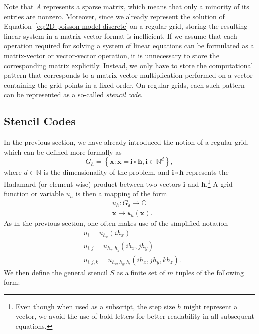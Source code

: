 Note that $A$ represents a sparse matrix, which means that only a minority of its entries are nonzero.
Moreover, since we already represent the solution of Equation~\eqref{eq:2D-poisson-model-discrete} on a regular grid, storing the resulting linear system in a matrix-vector format is inefficient.
If we assume that each operation required for solving a system of linear equations can be formulated as a matrix-vector or vector-vector operation, it is unnecessary to store the corresponding matrix explicitly.
Instead, we only have to store the computational pattern that corresponds to a matrix-vector multiplication performed on a vector containing the grid points in a fixed order.
On regular grids, each such pattern can be represented as a so-called \emph{stencil code}.

\subsection{Stencil Codes}
\label{subsec:stencil-codes}
In the previous section, we have already introduced the notion of a regular grid, which can be defined more formally as
\begin{equation}
	G_{h} = \left\{ \bm{x} : \bm{x} = \bm{i} \circ \bm{h}, \bm{i} \in \mathbb{N}^d \right\},
\end{equation}
where $d \in \mathbb{N}$ is the dimensionality of the problem, and $\bm{i} \circ \bm{h}$ represents the Hadamard (or element-wise) product between two vectors $\bm{i}$ and $\bm{h}$.\footnote{Even though when used as a subscript, the step size $h$ might represent a vector, we avoid the use of bold letters for better readability in all subsequent equations.}
A grid function or variable $u_h$ is then a mapping of the form
\begin{equation}
	\begin{split}
		& u_h : G_{h}\to \mathbb{C} \\
		& \bm{x} \to u_h(\bm{x}).
	\end{split}
\end{equation}
As in the previous section, one often makes use of the simplified notation
\begin{equation}
	\begin{split}
		 & u_i = u_{h_x}(i h_x) \\
		& u_{i,j} = u_{h_x, h_y}(i h_x, j h_y) \\
		& u_{i,j,k} = u_{h_x, h_y, h_z}(i h_x, j h_y, k h_z).
	\end{split}
\end{equation}
We then define the general stencil $S$ as a finite set of $m$ tuples of the following form:

